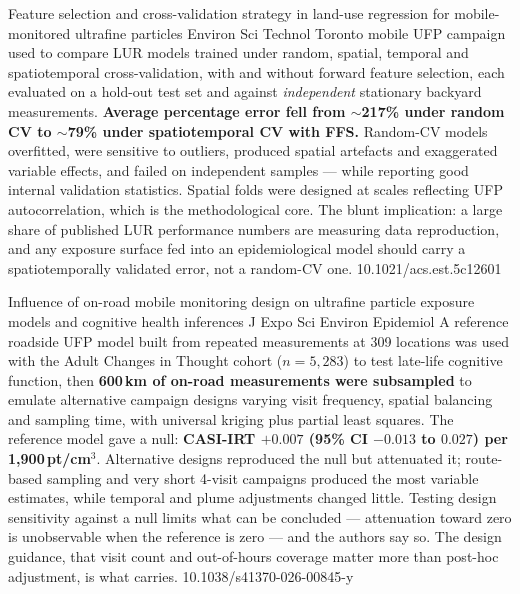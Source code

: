 \documentclass[10pt]{article}
\begin{document}

{Feature selection and cross-validation strategy in land-use regression for
mobile-monitored ultrafine particles}
{Environ Sci Technol}
{Toronto mobile UFP campaign used to compare LUR models trained under random, spatial,
temporal and spatiotemporal cross-validation, with and without forward feature selection,
each evaluated on a hold-out test set and against \emph{independent} stationary backyard
measurements. \textbf{Average percentage error fell from $\sim$217\% under random CV to
$\sim$79\% under spatiotemporal CV with FFS.} Random-CV models overfitted, were sensitive
to outliers, produced spatial artefacts and exaggerated variable effects, and failed on
independent samples --- while reporting good internal validation statistics. Spatial folds
were designed at scales reflecting UFP autocorrelation, which is the methodological core.
The blunt implication: a large share of published LUR performance numbers are measuring
data reproduction, and any exposure surface fed into an epidemiological model should
carry a spatiotemporally validated error, not a random-CV one.}
{10.1021/acs.est.5c12601}

{Influence of on-road mobile monitoring design on ultrafine particle exposure models and
cognitive health inferences}
{J Expo Sci Environ Epidemiol}
{A reference roadside UFP model built from repeated measurements at 309 locations was
used with the Adult Changes in Thought cohort ($n = 5{,}283$) to test late-life cognitive
function, then \textbf{600\,km of on-road measurements were subsampled} to emulate
alternative campaign designs varying visit frequency, spatial balancing and sampling
time, with universal kriging plus partial least squares. The reference model gave a null:
\textbf{CASI-IRT $+0.007$ (95\% CI $-0.013$ to $0.027$) per 1{,}900\,pt/cm$^3$}.
Alternative designs reproduced the null but attenuated it; route-based sampling and very
short 4-visit campaigns produced the most variable estimates, while temporal and plume
adjustments changed little. Testing design sensitivity against a null limits what can be
concluded --- attenuation toward zero is unobservable when the reference is zero --- and
the authors say so. The design guidance, that visit count and out-of-hours coverage
matter more than post-hoc adjustment, is what carries.}
{10.1038/s41370-026-00845-y}
\end{document}
